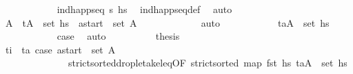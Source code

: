 \begin{isabellebody}
\ \ \ \ \ \ \ \ \ \ \isamarkupfalse%
\ {\isacartoucheopen}ind{\isacharunderscore}{\kern0pt}happ{\isacharunderscore}{\kern0pt}seq\ {\isasympi}s\ hs\ \isamarkupfalse%
\ ind{\isacharunderscore}{\kern0pt}happ{\isacharunderscore}{\kern0pt}seq{\isacharunderscore}{\kern0pt}def\ \isamarkupfalse%
\ auto\isanewline
\ \ \ \ \ \ \ \ \isamarkupfalse%
\ \isamarkupfalse%
\ A{\isacharprime}{\kern0pt}\ \ {\isachardoublequoteopen}{\isacharparenleft}{\kern0pt}t\isactrlsub {\isasympi}{\isacharcomma}{\kern0pt}A{\isacharprime}{\kern0pt}{\isacharparenright}{\kern0pt}\ {\isasymin}\ set\ hs\ \ {\isachardoublequoteopen}{\isacharquery}{\kern0pt}a\isactrlsub s\isactrlsub t\isactrlsub a\isactrlsub r\isactrlsub t\ {\isasymin}\ set\ A{\isacharprime}{\kern0pt}{\isachardoublequoteclose}\ \isanewline
\ \ \ \ \ \ \ \ \ \ \isamarkupfalse%
\ auto\isanewline
\ \ \ \ \ \ \ \ \isamarkupfalse%
\ \isamarkupfalse%
\ {\isachardoublequoteopen}{\isacharparenleft}{\kern0pt}t\isactrlsub a{\isacharcomma}{\kern0pt}A{\isacharprime}{\kern0pt}{\isacharparenright}{\kern0pt}\ {\isasymin}\ set\ hs\isanewline
\ \ \ \ \ \ \ \ \ \ \isamarkupfalse%
\ {\isacartoucheopen}{\isacharquery}{\kern0pt}case{}{\isacartoucheclose}\ \isamarkupfalse%
\ auto\isanewline
\ \ \ \ \ \ \ \ \isamarkupfalse%
\ {\isacharquery}{\kern0pt}thesis\isanewline
\ \ \ \ \ \ \ \ \ \ \isamarkupfalse%
\ {\isacartoucheopen}t\isactrlsub i\ {\isacharequal}{\kern0pt}\ t\isactrlsub a{\isacartoucheclose}\ {\isacartoucheopen}{\isacharquery}{\kern0pt}case{}{\isacartoucheclose}\ {\isacartoucheopen}{\isacharquery}{\kern0pt}a\isactrlsub s\isactrlsub t\isactrlsub a\isactrlsub r\isactrlsub t\ {\isasymin}\ set\ A{\isacharprime}{\kern0pt}{\isacartoucheclose}\isanewline
\ \ \ \ \ \ \ \ \ \ \ \ \ \ strict{\isacharunderscore}{\kern0pt}sorted{\isacharunderscore}{\kern0pt}drop{\isacharunderscore}{\kern0pt}le{\isacharunderscore}{\kern0pt}take{\isacharunderscore}{\kern0pt}leq{\isacharbrackleft}{\kern0pt}OF\ {\isacartoucheopen}strict{\isacharunderscore}{\kern0pt}sorted\ {\isacharparenleft}{\kern0pt}map\ fst\ hs\ {\isacartoucheopen}{\isacharparenleft}{\kern0pt}t\isactrlsub a{\isacharcomma}{\kern0pt}A{\isacharprime}{\kern0pt}{\isacharparenright}{\kern0pt}\ {\isasymin}\ set\ hs\isanewline

\end{isabellebody}
